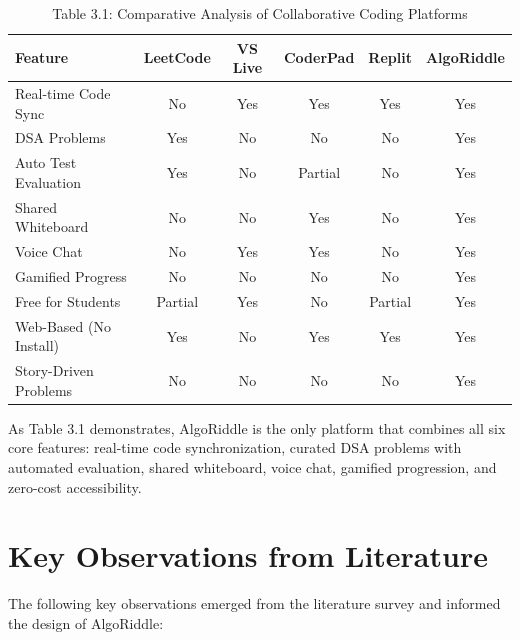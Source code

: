 \documentclass[12pt,a4paper,oneside]{report}
\newenvironment{reporttable}{%
  \small\singlespacing
}{%
  \doublespacing
}
\begin{document}
\begin{table}[H]
\centering
\caption{Table 3.1: Comparative Analysis of Collaborative Coding Platforms}
\label{tab:comparison}
\begin{reporttable}
\begin{tabular}{@{} l c c c c c @{}}
\toprule
\textbf{Feature} & \textbf{LeetCode} & \textbf{VS Live} & \textbf{CoderPad} & \textbf{Replit} & \textbf{AlgoRiddle} \\
\midrule
Real-time Code Sync & No & Yes & Yes & Yes & Yes \\
DSA Problems & Yes & No & No & No & Yes \\
Auto Test Evaluation & Yes & No & Partial & No & Yes \\
Shared Whiteboard & No & No & Yes & No & Yes \\
Voice Chat & No & Yes & Yes & No & Yes \\
Gamified Progress & No & No & No & No & Yes \\
Free for Students & Partial & Yes & No & Partial & Yes \\
Web-Based (No Install) & Yes & No & Yes & Yes & Yes \\
Story-Driven Problems & No & No & No & No & Yes \\
\bottomrule
\end{tabular}
\end{reporttable}
\end{table}

As Table 3.1 demonstrates, AlgoRiddle is the only platform that combines all six core features: real-time code synchronization, curated DSA problems with automated evaluation, shared whiteboard, voice chat, gamified progression, and zero-cost accessibility.

\section{Key Observations from Literature}

The following key observations emerged from the literature survey and informed the design of AlgoRiddle:
\end{document}
